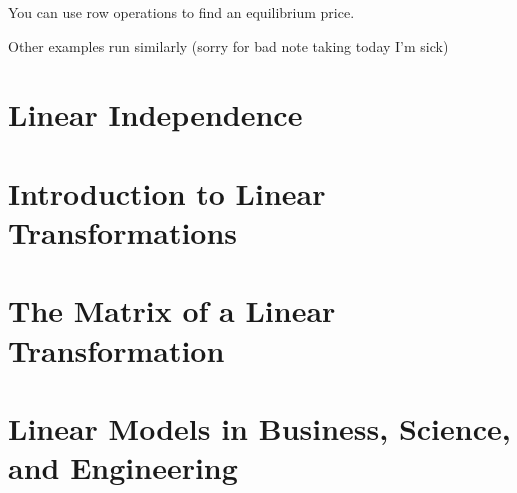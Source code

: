 \documentclass[../linalg.tex]{subfiles}
\begin{document}
You can use row operations to find an equilibrium price.

Other examples run similarly (sorry for bad note taking today I'm sick)

\section{Linear Independence}
\section{Introduction to Linear Transformations}
\section{The Matrix of a Linear Transformation}
\section{Linear Models in Business, Science, and Engineering}
\end{document}
